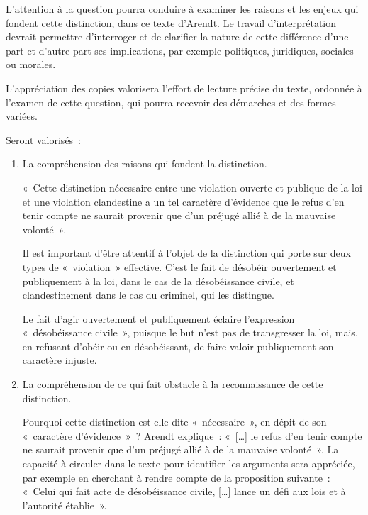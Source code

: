 {L'attention à la question pourra conduire à examiner les raisons et les enjeux qui
fondent cette distinction, dans ce texte d'Arendt. Le travail d'interprétation devrait
permettre d'interroger et de clarifier la nature de cette différence d'une part et d'autre
part ses implications, par exemple politiques, juridiques, sociales ou morales.

L'appréciation des copies valorisera l'effort de lecture précise du texte, ordonnée à
l'examen de cette question, qui pourra recevoir des démarches et des formes
variées.

Seront valorisés~:

\begin{enumerate}
\item La compréhension des raisons qui fondent la distinction.

«~Cette distinction nécessaire entre une violation ouverte et publique de la loi et une
violation clandestine a un tel caractère d'évidence que le refus d'en tenir compte ne
saurait provenir que d'un préjugé allié à de la mauvaise volonté~».

Il est important d'être attentif à l'objet de la distinction qui porte sur deux types de
«~violation~» effective. C'est le fait de désobéir ouvertement et publiquement à la loi,
dans le cas de la désobéissance civile, et clandestinement dans le cas du criminel,
qui les distingue.

Le fait d'agir ouvertement et publiquement éclaire l'expression «~désobéissance
civile~», puisque le but n'est pas de transgresser la loi, mais, en refusant d'obéir ou
en désobéissant, de faire valoir publiquement son caractère injuste.

\item La compréhension de ce qui fait obstacle à la reconnaissance de cette distinction.

Pourquoi cette distinction est-elle dite «~nécessaire~», en dépit de son «~caractère
d'évidence~»~? Arendt explique~: «~[…] le refus d'en tenir compte ne saurait provenir
que d'un préjugé allié à de la mauvaise volonté~». La capacité à circuler dans le texte
pour identifier les arguments sera appréciée, par exemple en cherchant à rendre
compte de la proposition suivante~: «~Celui qui fait acte de désobéissance civile, […]
lance un défi aux lois et à l'autorité établie~».


\end{enumerate}}
